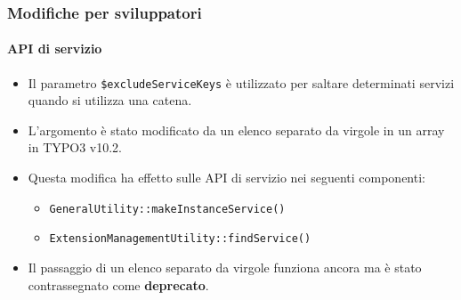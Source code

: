 \begin{frame}[fragile]
	\frametitle{Modifiche per sviluppatori}
	\framesubtitle{API di servizio}

	\begin{itemize}
		\item Il parametro \texttt{\$excludeServiceKeys} è utilizzato per saltare determinati servizi quando si utilizza una catena.
		\item L'argomento è stato modificato da un elenco separato da virgole in un array in TYPO3 v10.2.
		\item Questa modifica ha effetto sulle API di servizio nei seguenti componenti:

			\begin{itemize}
				\item \texttt{GeneralUtility::makeInstanceService()}
				\item \texttt{ExtensionManagementUtility::findService()}
			\end{itemize}

		\item Il passaggio di un elenco separato da virgole funziona ancora ma è stato contrassegnato come \textbf{deprecato}.

	\end{itemize}

\end{frame}

